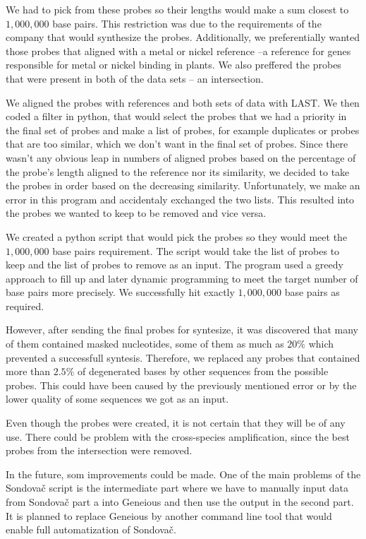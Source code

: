 We had to pick from these probes so their lengths would make a sum closest to $1,000,000$ base pairs. This restriction was due to the requirements of the company that would synthesize
the probes. 
Additionally, we preferentially wanted those probes that aligned with a metal or nickel reference --a reference for genes responsible for metal or nickel binding in plants. We also preffered the 
probes that were present in both of the data sets -- an intersection. 

We aligned the probes with references and both sets of data with LAST. We then coded a filter in python, that would select the probes that we had a priority in the final set of probes and make a
list of probes, for example duplicates or probes that are too similar, which we don't want in the final set of probes. Since there wasn't any obvious leap in numbers of aligned probes based on the 
percentage of the probe's length aligned to the reference nor its similarity, we decided to take the probes in order based on the decreasing similarity. 
Unfortunately, we make an error in this program and accidentaly exchanged the two lists. This resulted into the probes we wanted to keep to be removed and vice versa. 

We created a python script that would pick the probes so they would meet the $1,000,000$ base pairs requirement. The script would take the list of probes to keep and the list of probes to remove as an 
input. The program used a greedy approach to fill up and later dynamic programming to meet the target number of base pairs more precisely. We successfully hit exactly $1,000,000$ base pairs as required. 

However, after sending the final probes for syntesize, it was discovered that many of them contained masked nucleotides, some of them as much as $20\%$ which prevented a successfull syntesis. Therefore, we 
replaced any probes that contained more than $2.5\%$ of degenerated bases by other sequences from the possible probes. 
This could have been caused by the previously mentioned error or by the lower quality of some sequences we got as an input.

Even though the probes were created, it is not certain that they will be of any use. There could be problem with the cross-species amplification, since the best probes from the intersection were removed. 

In the future, som improvements could be made. 
One of the main problems of the Sondovač script is the intermediate part where we have to manually input data from Sondovač part a into Geneious and then use the output 
in the second part. 
It is planned to replace Geneious by another command line tool that would enable full automatization of Sondovač. 

